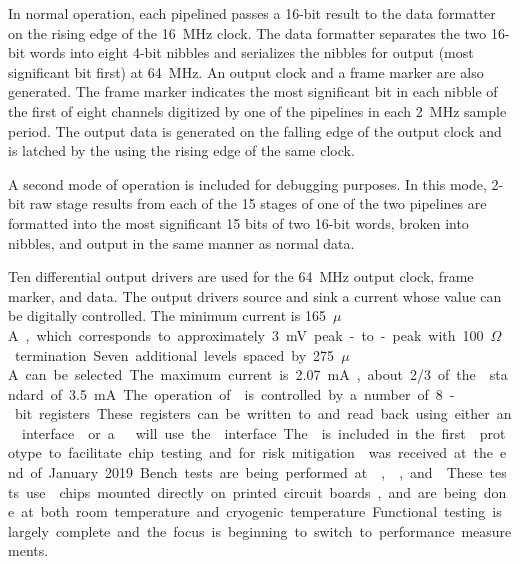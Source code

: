 In normal operation, each pipelined  passes a \num{16}-bit result to the
data formatter on the rising edge of the \SI{16}{MHz} clock.  The data formatter
separates the two \num{16}-bit words into eight \num{4}-bit nibbles and serializes the
nibbles for output (most significant bit first) at \SI{64}{MHz}.   An output
clock and a frame marker are also generated.  The frame marker indicates the most
significant bit in each nibble of the first of eight channels digitized by one
of the  pipelines in each \SI{2}{MHz} sample period.  The output data
is generated on the falling edge of the output clock and is latched by the
  using the rising edge of the same clock.  

A second
mode of operation is included for debugging purposes.  In this mode, \num{2}-bit raw
stage results from each of the \num{15} stages of one of the two pipelines are formatted
into the most significant \num{15} bits of two \num{16}-bit words, broken into nibbles, and
output in the same manner as normal data.

Ten differential output drivers are used for the \SI{64}{MHz} output clock, frame
marker, and  data.  The output drivers source and sink a current whose
value can be digitally controlled.  The minimum current is \SI{165}{$\mu$A},
which corresponds to approximately \SI{3}{mV} peak-to-peak with \SI{100}{$\Omega$}
termination.  Seven additional levels spaced by \SI{275}{$\mu$A} can be selected.
The maximum current is \SI{2.07}{mA}, about \num{2/3} of the  standard of
\SI{3.5}{mA}.

The operation of  is controlled by a number of \num{8}-bit registers.
These registers can be written to and read back using either an 
interface~\cite{bib:I2C} or a .  will use the  interface.  The
 is included in the first  prototype to facilitate chip testing
and for risk mitigation.

 was received at the end of January 2019.  Bench tests are being performed at
, , and .  These tests use  chips mounted directly
on printed circuit boards, and are being done at both room temperature and cryogenic temperature.
Functional testing is largely complete and the focus is beginning to switch to performance measurements.

